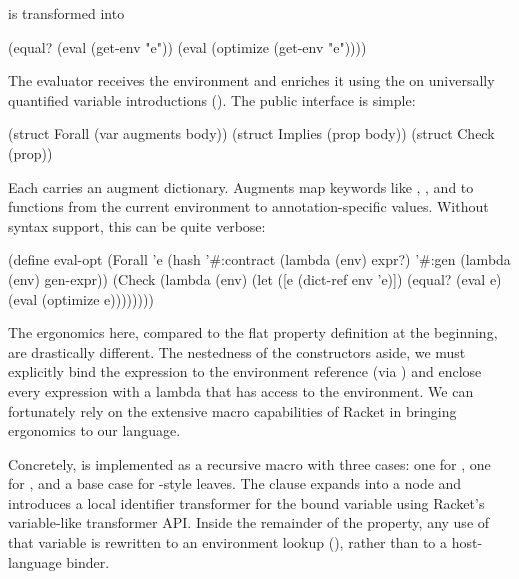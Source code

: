 is transformed into

\begin{code}[language=Racket]
(equal? (eval (get-env "e")) (eval (optimize (get-env "e"))))
\end{code}

The evaluator receives the environment and enriches it using the  on
universally quantified variable introductions (). The public interface is
simple:

\begin{code}[language=Racket]
(struct Forall (var augments body))
(struct Implies (prop body))
(struct Check (prop))
\end{code}

Each  carries an augment dictionary. Augments map
keywords like , , and
 to functions from the current environment to
annotation-specific values. Without syntax support, this can be quite verbose:

\begin{code}[language=Racket]
(define eval-opt
  (Forall 'e (hash '#:contract (lambda (env) expr?)
                   '#:gen      (lambda (env) gen-expr))
          (Check (lambda (env)
                   (let ([e (dict-ref env 'e)])
                     (equal? (eval e) (eval (optimize e))))))))
\end{code}

The ergonomics here, compared to the flat property definition at the beginning, are
drastically different. The nestedness of the constructors aside, we must explicitly
bind the expression  to the environment reference (via ) and enclose every expression with a lambda that has access to the environment. We
can fortunately rely on the extensive macro capabilities of Racket in bringing
ergonomics to our language.

Concretely,  is implemented as a recursive  macro
with three cases: one for , one for , and a base case for
-style leaves. The  clause expands into a  node
and introduces a local identifier transformer for the bound variable using Racket's
variable-like transformer API. Inside the remainder of the property, any use of that
variable is rewritten to an environment lookup (), rather than
to a host-language binder.

